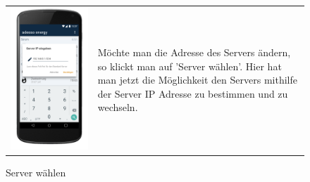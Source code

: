 \begin{figure}[h]
\begin{tabularx}{\textwidth}{X  X}
	\includegraphics[scale = 0.155]{img/AndroidMockup/serverLocation} \caption{Server wählen} & Möchte man die Adresse des Servers ändern, so klickt man auf 'Server wählen'. Hier hat man jetzt die Möglichkeit den Servers mithilfe der Server IP Adresse zu bestimmen und zu wechseln.
\end{tabularx}
\end{figure}

